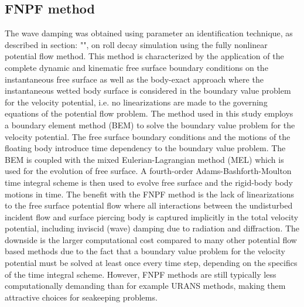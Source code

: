 \subsection*{FNPF method}\label{fnpf-method}
\label{fnpf-method} The wave damping was obtained using parameter an
identification technique, as described in section: "",
on roll decay simulation using the fully nonlinear potential flow
method. This method is characterized by the application of the complete
dynamic and kinematic free surface boundary conditions on the
instantaneous free surface as well as the body-exact approach where the
instantaneous wetted body surface is considered in the boundary value
problem for the velocity potential, i.e. no linearizations are made to
the governing equations of the potential flow problem.
\quad The method used in this study employs a boundary element method
(BEM) \citep{7505983/FD4N3DW2} to solve the boundary value problem for
the velocity potential.
\quad The free surface boundary conditions and the motions of the
floating body introduce time dependency to the boundary value problem.
The BEM is coupled with the mixed Eulerian-Lagrangian method (MEL)
\citep{7505983/ZKB494GT} which is used for the evolution of free surface.
A fourth-order Adams-Bashforth-Moulton time integral scheme is then used
to evolve free surface and the rigid-body body motions in time.
\quad The benefit with the FNPF method is the lack of linearizations to
the free surface potential flow where all interactions between the
undisturbed incident flow and surface piercing body is captured
implicitly in the total velocity potential, including inviscid (wave)
damping due to radiation and diffraction. The downside is the larger
computational cost compared to many other potential flow based methods
due to the fact that a boundary value problem for the velocity potential
must be solved at least once every time step, depending on the specifics
of the time integral scheme. However, FNPF methods are still typically
less computationally demanding than for example URANS methods, making
them attractive choices for seakeeping problems.
